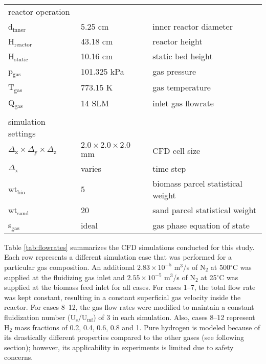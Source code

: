 \begin{table}[H]
\begin{tabular}{lll}
        \\
        reactor operation \\
        d$_\text{inner}$      & 5.25 cm       & inner reactor diameter \\
        H$_\text{reactor}$    & 43.18 cm      & reactor height \\
        H$_\text{static}$     & 10.16 cm      & static bed height \\
        p$_\text{gas}$        & 101.325 kPa   & gas pressure \\
        T$_\text{gas}$        & 773.15 K      & gas temperature \\
        Q$_\text{gas}$        & 14 SLM        & inlet gas flowrate \\
        \\
        simulation settings \\
        $\Delta_\text{x} \times \Delta_\text{y} \times \Delta_\text{z}$ & $2.0 \times 2.0 \times 2.0$ mm & CFD cell size \\
        $\Delta_\text{x}$   & varies & time step \\
        wt$_\text{bio}$      & 5     & biomass parcel statistical weight \\
        wt$_\text{sand}$     & 20     & sand parcel statistical weight \\
        s$_\text{gas}$               & ideal  & gas phase equation of state \\
        \bottomrule
    \end{tabular}
\end{table}

Table \ref{tab:flowrates} summarizes the CFD simulations conducted for this study. Each row represents a different simulation case that was performed for a particular gas composition. An additional $2.83\times10^{-5}$ m$^3$/s of N$_2$ at 500$^\circ$C was supplied at the fluidizing gas inlet and $2.55\times10^{-5}$ m$^3$/s of N$_2$ at 25$^\circ$C was supplied at the biomass feed inlet for all cases. For cases 1--7, the total flow rate was kept constant, resulting in a constant superficial gas velocity inside the reactor. For cases 8--12, the gas flow rates were modified to maintain a constant fluidization number (U$_\text{s}$/U$_\text{mf}$) of 3 in each simulation. Also, cases 8--12 represent H$_2$ mass fractions of 0.2, 0.4, 0.6, 0.8 and 1. Pure hydrogen is modeled because of its drastically different properties compared to the other gases (see following section); however, its applicability in experiments is limited due to safety concerns.

